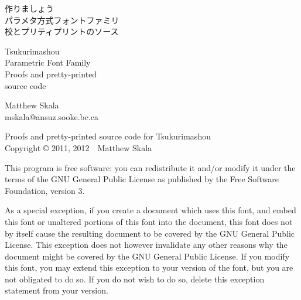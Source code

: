 
\makeatletter{}\makeatother



\pagestyle{plain}\thispagestyle{empty}


\kaku
\begin{center}\LARGE

\vspace*{\fill}

{\Huge 作りましょう~\TsukurimashouVWide}\\
{\huge パラメタ方式フォントファミリ\\
校とプリティプリントのソース}

\vspace*{0.75in}

{\Huge Tsukurimashou~\TsukurimashouVersion}\\
{\huge Parametric Font Family\\
Proofs and pretty-printed\\source code}

\vspace*{1.5in}

Matthew Skala\\
mskala@ansuz.sooke.bc.ca\\
\TsukurimashouRDWide\qquad\TsukurimashouReleaseDate

\vspace*{\fill}

\end{center}
\clearpage


\vspace*{\fill}

Proofs and pretty-printed source code for Tsukurimashou\\
Copyright © 2011, 2012~~Matthew Skala

This program is free software: you can redistribute it and/or modify
it under the terms of the GNU General Public License as published by
the Free Software Foundation, version 3.

As a special exception, if you create a document which uses this font, and
embed this font or unaltered portions of this font into the document, this
font does not by itself cause the resulting document to be covered by the
GNU General Public License. This exception does not however invalidate any
other reasons why the document might be covered by the GNU General Public
License. If you modify this font, you may extend this exception to your
version of the font, but you are not obligated to do so. If you do not
wish to do so, delete this exception statement from your version.

